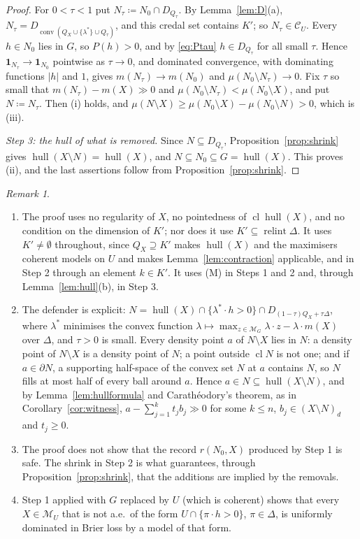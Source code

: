 \documentclass[11pt]{article}
\newcommand{\one}{\mathbf{1}}
\newcommand{\M}{\mathcal{M}}
\newcommand{\CC}{\mathcal{C}}
\newcommand{\hull}{\operatorname{hull}}
\DeclareMathOperator{\conv}{conv}
\DeclareMathOperator{\relint}{relint}
\DeclareMathOperator{\cl}{cl}
\theoremstyle{plain}
\theoremstyle{definition}
\theoremstyle{remark}
\newtheorem{remark}[theorem]{Remark}
\begin{document}
\begin{proof}
For $0<\tau<1$ put $N_\tau\coloneqq N_0\cap D_{Q_\tau}$. By Lemma~\ref{lem:D}(a),
$N_\tau=D_{\conv(Q_X\cup\{\lambda^\ast\}\cup Q_\tau)}$, and this credal set contains $K'$;
so $N_\tau\in\CC_U$. Every $h\in N_0$ lies in $G$, so $P(h)>0$, and by \eqref{eq:Ptau}
$h\in D_{Q_\tau}$ for all small $\tau$. Hence $\one_{N_\tau}\to\one_{N_0}$
pointwise as $\tau\to0$, and dominated convergence, with dominating functions $|h|$ and
$1$, gives $m(N_\tau)\to m(N_0)$ and $\mu(N_0\setminus N_\tau)\to0$. Fix $\tau$ so small
that $m(N_\tau)-m(X)\gg0$ and $\mu(N_0\setminus N_\tau)<\mu(N_0\setminus X)$, and put
$N\coloneqq N_\tau$. Then (i) holds, and $\mu(N\setminus X)\ge\mu(N_0\setminus X)-
\mu(N_0\setminus N)>0$, which is (iii).

\emph{Step 3: the hull of what is removed.} Since $N\subseteq D_{Q_\tau}$,
Proposition~\ref{prop:shrink} gives $\hull(X\setminus N)=\hull(X)$, and $N\subseteq
N_0\subseteq G=\hull(X)$. This proves (ii), and the last assertions follow from
Proposition~\ref{prop:shrink}.
\end{proof}

\begin{remark}\label{rem:H}
\begin{enumerate}[label=(\alph*)]
  \item The proof uses no regularity of $X$, no pointedness of $\cl\hull(X)$, and no
  condition on the dimension of $K'$; nor does it use $K'\subseteq\relint\Delta$. It uses
  $K'\neq\emptyset$ throughout, since $Q_X\supseteq K'$ makes $\hull(X)$ and the maximisers
  coherent models on $U$ and makes Lemma~\ref{lem:contraction} applicable, and in Step 2
  through an element $k\in K'$. It uses (M) in Steps 1 and 2 and, through
  Lemma~\ref{lem:hull}(b), in Step 3.
  \item The defender is explicit: $N=\hull(X)\cap\{\lambda^\ast\cdot h>0\}\cap
  D_{(1-\tau)Q_X+\tau\Delta}$, where $\lambda^\ast$ minimises the convex function
  $\lambda\mapsto\max_{z\in\M_G}\lambda\cdot z-\lambda\cdot m(X)$ over $\Delta$, and
  $\tau>0$ is small. Every density point $a$ of $N\setminus X$ lies in $N$: a density
  point of $N\setminus X$ is a density point of $N$; a point outside $\cl N$ is not one;
  and if $a\in\partial N$, a supporting half-space of the convex set $N$ at $a$ contains
  $N$, so $N$ fills at most half of every ball around $a$. Hence $a\in N\subseteq
  \hull(X\setminus N)$, and by Lemma~\ref{lem:hullformula} and Carath\'eodory's theorem,
  as in Corollary~\ref{cor:witness}, $a-\sum_{j=1}^kt_jb_j\gg0$ for some $k\le n$,
  $b_j\in(X\setminus N)_d$ and $t_j\ge0$.
  \item The proof does not show that the record $r(N_0,X)$ produced by Step 1 is safe. The
  shrink in Step 2 is what guarantees, through Proposition~\ref{prop:shrink}, that the
  additions are implied by the removals.
  \item Step 1 applied with $G$ replaced by $U$ (which is coherent) shows that every
  $X\in\M_U$ that is not a.e.\ of the form $U\cap\{\pi\cdot h>0\}$, $\pi\in\Delta$, is
  uniformly dominated in Brier loss by a model of that form.
\end{enumerate}
\end{remark}
\end{document}
